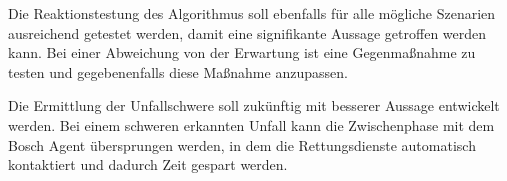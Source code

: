 Die Reaktionstestung des Algorithmus soll ebenfalls für alle mögliche Szenarien ausreichend getestet werden, damit eine signifikante Aussage getroffen werden kann. Bei einer Abweichung von der Erwartung ist eine Gegenmaßnahme zu testen und gegebenenfalls diese Maßnahme anzupassen.

Die Ermittlung der Unfallschwere soll zukünftig mit besserer Aussage entwickelt werden. Bei einem schweren erkannten Unfall kann die Zwischenphase mit dem Bosch Agent übersprungen werden, in dem die Rettungsdienste automatisch kontaktiert und dadurch Zeit gespart werden.

%
%
%
